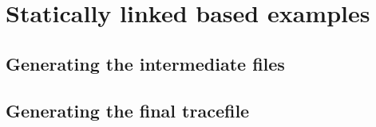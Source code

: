 \section{Statically linked based examples}

\subsection{Generating the intermediate files}

\subsection{Generating the final tracefile}

